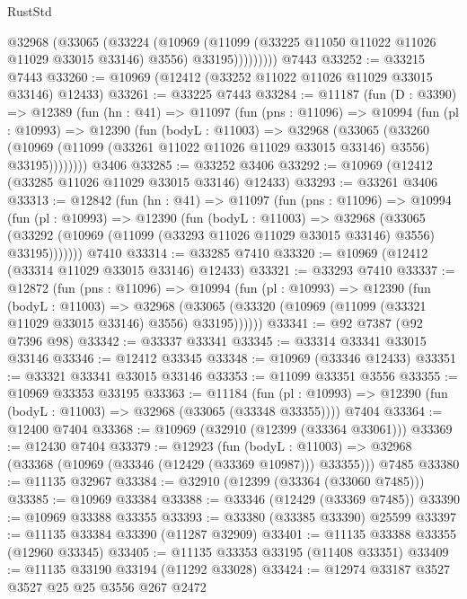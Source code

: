 \begin{lexlean}{RustStd}
\begin{coremodule}
              @32968
                (@33065
                  (@33224
                    (@10969
                      (@11099 (@33225 @11050 @11022 @11026 @11029 @33015 @33146) @3556)
                      @33195)))))))))
    @7443
@33252 := @33215 @7443
@33260 := @10969 (@12412 (@33252 @11022 @11026 @11029 @33015 @33146) @12433)
@33261 := @33225 @7443
@33284 := @11187
    (fun (D : @3390) =>
    @12389
      (fun (hn : @41) =>
      @11097
        (fun (pns : @11096) =>
        @10994
          (fun (pl : @10993) =>
          @12390
            (fun (bodyL : @11003) =>
            @32968
              (@33065
                (@33260
                  (@10969 (@11099 (@33261 @11022 @11026 @11029 @33015 @33146) @3556) @33195))))))))
    @3406
@33285 := @33252 @3406
@33292 := @10969 (@12412 (@33285 @11026 @11029 @33015 @33146) @12433)
@33293 := @33261 @3406
@33313 := @12842
    (fun (hn : @41) =>
    @11097
      (fun (pns : @11096) =>
      @10994
        (fun (pl : @10993) =>
        @12390
          (fun (bodyL : @11003) =>
          @32968
            (@33065
              (@33292 (@10969 (@11099 (@33293 @11026 @11029 @33015 @33146) @3556) @33195)))))))
    @7410
@33314 := @33285 @7410
@33320 := @10969 (@12412 (@33314 @11029 @33015 @33146) @12433)
@33321 := @33293 @7410
@33337 := @12872
    (fun (pns : @11096) =>
    @10994
      (fun (pl : @10993) =>
      @12390
        (fun (bodyL : @11003) =>
        @32968 (@33065 (@33320 (@10969 (@11099 (@33321 @11029 @33015 @33146) @3556) @33195))))))
@33341 := @92 @7387 (@92 @7396 @98)
@33342 := @33337 @33341
@33345 := @33314 @33341 @33015 @33146
@33346 := @12412 @33345
@33348 := @10969 (@33346 @12433)
@33351 := @33321 @33341 @33015 @33146
@33353 := @11099 @33351 @3556
@33355 := @10969 @33353 @33195
@33363 := @11184
    (fun (pl : @10993) => @12390 (fun (bodyL : @11003) => @32968 (@33065 (@33348 @33355))))
    @7404
@33364 := @12400 @7404
@33368 := @10969 (@32910 (@12399 (@33364 @33061)))
@33369 := @12430 @7404
@33379 := @12923
    (fun (bodyL : @11003) => @32968 (@33368 (@10969 (@33346 (@12429 (@33369 @10987))) @33355)))
    @7485
@33380 := @11135 @32967
@33384 := @32910 (@12399 (@33364 (@33060 @7485)))
@33385 := @10969 @33384
@33388 := @33346 (@12429 (@33369 @7485))
@33390 := @10969 @33388 @33355
@33393 := @33380 (@33385 @33390) @25599
@33397 := @11135 @33384 @33390 (@11287 @32909)
@33401 := @11135 @33388 @33355 (@12960 @33345)
@33405 := @11135 @33353 @33195 (@11408 @33351)
@33409 := @11135 @33190 @33194 (@11292 @33028)
@33424 := @12974
    @33187
    @3527
    @3527
    @25
    @25
    @3556
    @267
    @2472

\end{coremodule}
\end{lexlean}
